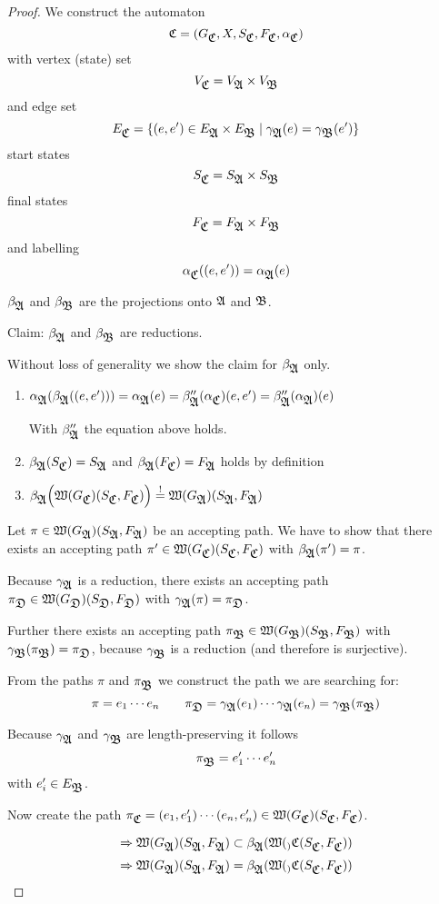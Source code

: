 \begin{proof}
We construct the automaton 
\[ \fa{C} = (G_{\fa{C}}, X, S_{\fa{C}}, F_{\fa{C}}, \alpha_{\fa{C}}) \]
with vertex (state) set
\[ V_{\fa{C}} = V_{\fa{A}} \times V_{\fa{B}} \]
and edge set
\[ E_{\fa{C}} = \{ (e, e') \in E_{\fa{A}} \times E_{\fa{B}} \mid
\gamma_{\fa{A}}(e) = \gamma_{\fa{B}}(e') \} \]
start states
\[ S_{\fa{C}} = S_{\fa{A}} \times S_{\fa{B}} \]
final states
\[ F_{\fa{C}} = F_{\fa{A}} \times F_{\fa{B}} \]
and labelling
\[ \alpha_{\fa{C}}((e, e')) = \alpha_{\fa{A}}(e) \] 

$\beta_{\fa{A}}$ and $\beta_{\fa{B}}$ are the projections onto $\fa{A}$ and
$\fa{B}$.

Claim: $\beta_{\fa{A}}$ and $\beta_{\fa{B}}$ are reductions.

Without loss of generality we show the claim for $\beta_{\fa{A}}$ only.

\begin{enumerate}
\item $\alpha_{\fa{A}}(\beta_{\fa{A}}((e,e'))) = \alpha_{\fa{A}}(e) =
\beta''_{\fa{A}}(\alpha_{\fa{C}})(e, e') = \beta''_{\fa{A}}(\alpha_{\fa{A}})(e)$

With $\beta''_{\fa{A}}$ the equation above holds.
\item $\beta_{\fa{A}}(S_{\fa{C}}) = S_{\fa{A}}$ and $\beta_{\fa{A}}(F_{\fa{C}})
= F_{\fa{A}}$ holds by definition
\item $\beta_{\fa{A}}\Big(\pathcat{G_{\fa{C}}}(S_{\fa{C}}, F_{\fa{C}})\Big)
\stackrel{!}{=} \pathcat{G_{\fa{A}}}(S_{\fa{A}}, F_{\fa{A}})$
\end{enumerate}

Let $\pi \in \pathcat{G_{\fa{A}}}(S_{\fa{A}}, F_{\fa{A}})$ be an accepting path.
We have to show that there exists an accepting path $\pi' \in
\pathcat{G_{\fa{C}}}(S_{\fa{C}}, F_{\fa{C}})$ with $\beta_{\fa{A}}(\pi') = \pi$.

Because $\gamma_{\fa{A}}$ is a reduction, there exists an accepting path
$\pi_{\fa{D}} \in \pathcat{G_{\fa{D}}}(S_{\fa{D}}, F_{\fa{D}})$ with
$\gamma_{\fa{A}}(\pi) = \pi_{\fa{D}}$.

Further there exists an accepting path $\pi_{\fa{B}} \in
\pathcat{G_{\fa{B}}}(S_{\fa{B}}, F_{\fa{B}})$ with
$\gamma_{\fa{B}}(\pi_{\fa{B}}) = \pi_{\fa{D}}$, because $\gamma_{\fa{B}}$ is a
reduction (and therefore is surjective).

From the paths $\pi$ and $\pi_{\fa{B}}$ we construct the path we are searching
for:
\[ \pi = e_1 \cdots e_n \qquad \pi_{\fa{D}} = \gamma_{\fa{A}}(e_1) \cdots
\gamma_{\fa{A}}(e_n) = \gamma_{\fa{B}}(\pi_{\fa{B}}) \]

Because $\gamma_{\fa{A}}$ and $\gamma_{\fa{B}}$ are length-preserving it follows
\[ \pi_{\fa{B}} = e'_1 \cdots e'_n \]
with $e'_i \in E_{\fa{B}}$.

Now create the path $\pi_{\fa{C}} = (e_1, e'_1) \cdots (e_n, e'_n) \in
\pathcat{G_{\fa{C}}}(S_{\fa{C}}, F_{\fa{C}})$.

\[ \Rightarrow \pathcat{G_{\fa{A}}}(S_{\fa{A}}, F_{\fa{A}}) \subset
\beta_{\fa{A}}(\pathcat_{\fa{C}}(S_{\fa{C}}, F_{\fa{C}})) \]
\[ \Rightarrow \pathcat{G_{\fa{A}}}(S_{\fa{A}}, F_{\fa{A}}) =
\beta_{\fa{A}}(\pathcat_{\fa{C}}(S_{\fa{C}}, F_{\fa{C}})) \]
\end{proof}

